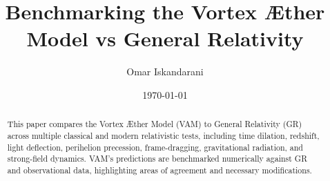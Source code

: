\documentclass{article}
\author{Omar Iskandarani}
\title{Benchmarking the Vortex Æther Model vs General Relativity}
\date{\today}
\affiliation{Independent Researcher, Groningen, The Netherlands}
\begin{document}
\maketitle

\begin{abstract}
This paper compares the Vortex Æther Model (VAM) to General Relativity (GR) across multiple classical and modern relativistic tests, including time dilation, redshift, light deflection, perihelion precession, frame-dragging, gravitational radiation, and strong-field dynamics. VAM’s predictions are benchmarked numerically against GR and observational data, highlighting areas of agreement and necessary modifications.
\end{abstract}

























\end{document}
